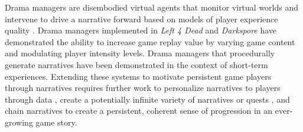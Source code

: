 \documentclass[conference]{IEEEtran}
\begin{document}
Drama %
managers are disembodied virtual agents that monitor virtual worlds and intervene to drive a narrative forward based on models of player experience quality \cite{riedl2013:in-aimag}.
Drama managers implemented in {\em Left 4 Dead} and {\em Darkspore} have demonstrated the ability to increase game replay value by varying game content and modulating player intensity levels.
Drama managers that procedurally generate narratives have been demonstrated in the context of short-term experiences.
Extending these systems to motivate persistent game players through narratives requires further work to personalize narratives to players through data \cite{yu2012:prefix-based}, create a potentially infinite variety of narratives or quests \cite{li2012:crowdsource-narr-int}, and chain narratives to create a persistent, coherent sense of progression in an ever-growing game story.


\end{document}
